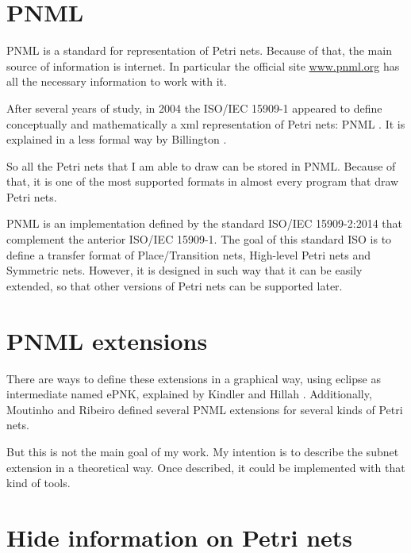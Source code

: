 \section{PNML}
PNML is a standard for representation of Petri nets. Because of that, the
main source of information is internet. In particular the official site \url{www.pnml.org}
\cite{PNML-pnml.org} has all the necessary information to work with it.


After several years of study, in 2004 the ISO/IEC 15909-1  \cite{PNML-iso/iec-15909-1} appeared to define conceptually and mathematically a xml representation
of Petri nets: PNML \cite{PNML-Hillah2006307}.  It is explained in a less formal way by Billington \cite{PNML-Billington2003483}. 


So all the Petri nets that I am able to draw can be stored in PNML. Because
of that, it is one of the most supported formats in almost every program that
draw Petri nets. 

PNML \cite{PNML-pnml.org} is an implementation defined by the standard ISO/IEC 15909-2:2014 \cite{PNML-iso/iec-15909-2:2011} that complement the anterior
ISO/IEC 15909-1. The goal of this standard ISO is to define a transfer format of Place/Transition nets, High-level Petri nets and Symmetric nets. However, it is designed in
such way that it can be easily extended, so that other versions of Petri
nets can be supported later.

 


\section{PNML extensions}

There are ways to define these extensions in a graphical way, using eclipse
as intermediate named ePNK, explained by Kindler \cite{PNMLE-Kindler2011318} and Hillah
\cite{PNMLE-Hillah201246}. Additionally, Moutinho \cite{PNMLE-Moutinho20102156} and Ribeiro \cite{PNMLE-Ribeiro2011777} defined several PNML extensions for several kinds of Petri nets.

But this is not the main goal of my work. My intention is to describe the subnet extension in a theoretical way. Once described, it could be implemented with that kind of tools.



\section{Hide information on Petri nets}

